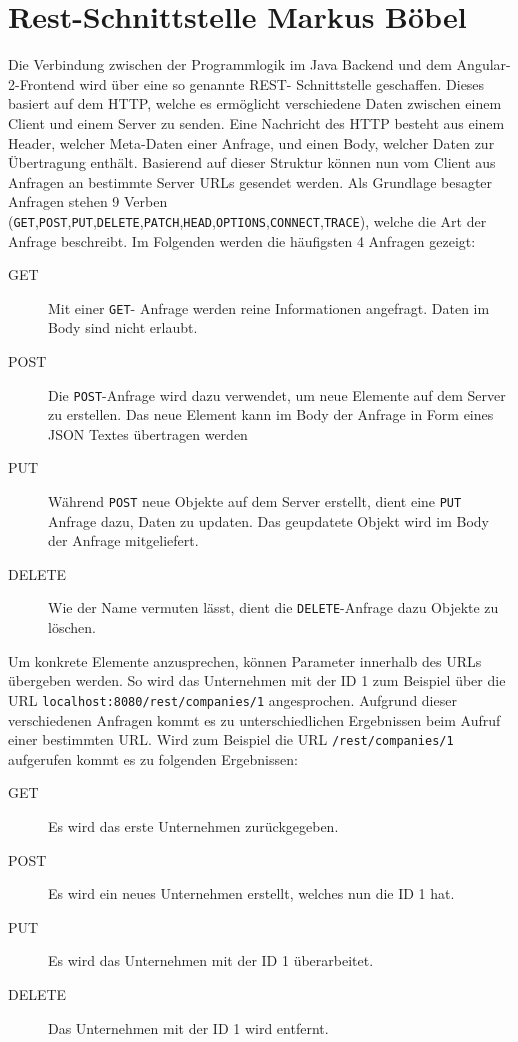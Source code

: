 \section{Rest-Schnittstelle \textnormal{\textsf{\small{Markus Böbel}}}}

Die Verbindung zwischen der Programmlogik im Java Backend und dem Angular-2-Frontend wird über eine so genannte \acf{REST}- Schnittstelle geschaffen. Dieses basiert auf dem \acf{HTTP}, welche es ermöglicht verschiedene Daten zwischen einem Client und einem Server zu senden.
Eine Nachricht des \acl{HTTP} besteht aus einem Header, welcher Meta-Daten einer Anfrage, und einen Body, welcher Daten zur Übertragung enthält.
Basierend auf dieser Struktur können nun vom Client aus Anfragen an bestimmte Server URLs gesendet werden. Als Grundlage besagter Anfragen stehen 9 Verben (\texttt{GET},\texttt{POST},\texttt{PUT},\texttt{DELETE},\texttt{PATCH},\texttt{HEAD},\texttt{OPTIONS},\texttt{CONNECT},\texttt{TRACE}), welche die Art der Anfrage beschreibt. Im Folgenden werden die häufigsten 4 Anfragen gezeigt:

\begin{description} 
	\item  [GET] {Mit einer \texttt{GET}- Anfrage werden reine Informationen angefragt. Daten im Body sind nicht erlaubt.}
	\item [POST]{Die \texttt{POST}-Anfrage wird dazu verwendet, um neue Elemente auf dem Server zu erstellen. Das neue Element kann im Body der Anfrage in Form eines JSON Textes übertragen werden}
	\item [PUT]{Während \texttt{POST} neue Objekte auf dem Server erstellt, dient eine \texttt{PUT} Anfrage dazu, Daten zu updaten. Das geupdatete Objekt wird im Body der Anfrage mitgeliefert}.
	\item[DELETE] {Wie der Name vermuten lässt, dient die \texttt{DELETE}-Anfrage dazu Objekte zu löschen}.
	
\end{description}

Um konkrete Elemente anzusprechen, können Parameter innerhalb des URLs übergeben werden. So wird das Unternehmen mit der ID 1 zum Beispiel über die URL 
\texttt{localhost:8080/rest/companies/1} angesprochen.
Aufgrund dieser verschiedenen Anfragen kommt es zu unterschiedlichen Ergebnissen beim Aufruf einer bestimmten URL. Wird zum Beispiel die URL \texttt{/rest/companies/1} aufgerufen kommt es zu folgenden Ergebnissen:

\begin{description} 
	\item[GET] Es wird das erste Unternehmen zurückgegeben.
	\item[POST] Es wird ein neues Unternehmen erstellt, welches nun die ID 1 hat.
	\item[PUT] Es wird das Unternehmen mit der ID 1 überarbeitet.
	\item[DELETE] Das Unternehmen mit der ID 1 wird entfernt.
\end{description}

